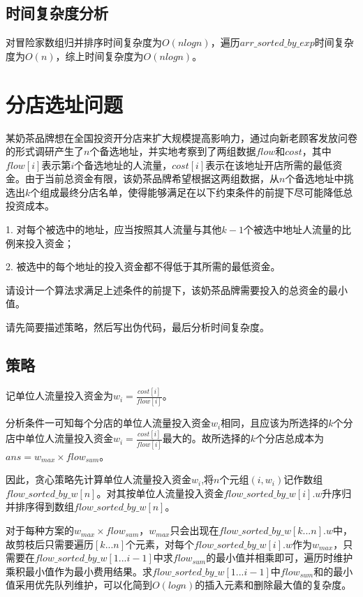 \documentclass{article}
\begin{document}
\subsection{时间复杂度分析}

对冒险家数组归并排序时间复杂度为$O(nlogn)$，遍历$arr\_sorted\_by\_exp$时间复杂度为$O(n)$，综上时间复杂度为$O(nlogn)$。

\section{分店选址问题}

某奶茶品牌想在全国投资开分店来扩大规模提高影响力，通过向新老顾客发放问卷的形式调研产生了$n$个备选地址，并实地考察到了两组数据$flow$和$cost$，其中$flow[i]$表示第$i$个备选地址的人流量，$cost[i]$表示在该地址开店所需的最低资金。由于当前总资金有限，该奶茶品牌希望根据这两组数据，从$n$个备选地址中挑选出$k$个组成最终分店名单，使得能够满足在以下约束条件的前提下尽可能降低总投资成本。

1. 对每个被选中的地址，应当按照其人流量与其他$k-1$个被选中地址人流量的比例来投入资金；

2. 被选中的每个地址的投入资金都不得低于其所需的最低资金。

请设计一个算法求满足上述条件的前提下，该奶茶品牌需要投入的总资金的最小值。

请先简要描述策略，然后写出伪代码，最后分析时间复杂度。

\subsection{策略}

记单位人流量投入资金为$w_i=\frac{cost[i]}{flow[i]}$。

分析条件一可知每个分店的单位人流量投入资金$w_i$相同，且应该为所选择的$k$个分店中单位人流量投入资金$w_i=\frac{cost[i]}{flow[i]}$最大的。故所选择的$k$个分店总成本为$ans = w_{max} \times flow_{sum}$。

因此，贪心策略先计算单位人流量投入资金$w_i$,将$n$个元组$(i,w_i)$记作数组$flow\_sorted\_by\_w[n]$。对其按单位人流量投入资金$flow\_sorted\_by\_w[i].w$升序归并排序得到数组$flow\_sorted\_by\_w[n]$。

对于每种方案的$w_{max} \times flow_{sum}$，$w_{max}$只会出现在$flow\_sorted\_by\_w[k...n].w$中，故剪枝后只需要遍历$[k...n]$个元素，对每个$flow\_sorted\_by\_w[i].w$作为$w_{max}$，只需要在$flow\_sorted\_by\_w[1...i-1]$中求$flow_{sum}$的最小值并相乘即可，遍历时维护乘积最小值作为最小费用结果。求$flow\_sorted\_by\_w[1...i-1]$中$flow_{sum}$和的最小值采用优先队列维护，可以化简到$O(logn)$的插入元素和删除最大值的复杂度。
\end{document}
